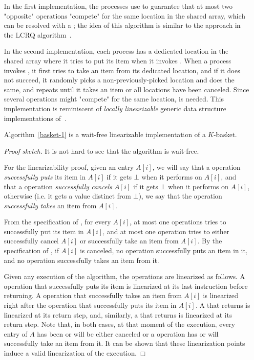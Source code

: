 In the first implementation, the processes use \FAI to guarantee that at most two "opposite" operations "compete" for the same location in the shared array, which can be resolved with a \SWAP; the idea of this algorithm is similar to the approach in the LCRQ algorithm~\cite{ppopp2013x86queues}.

In the second implementation, each process has a dedicated location in the shared array where it tries to put its item when it invokes \Put. When a process invokes \Take, it first tries to take an item from its dedicated location, and if it does not succeed, it randomly picks a non-previously-picked location and does the same, and repeats until it takes an item or all locations have been canceled.  Since several operations might "compete" for the same location, \CAS is needed.  This implementation is reminiscent of \emph{locally linearizable} generic data structure implementations of~\cite{DBLP_conf_concur_HaasHHKLPSSV16}.

\begin{theorem}
Algorithm~\ref{basket-1} is a wait-free linearizable implementation of a $K$-basket.
\end{theorem}

\begin{proof}[Proof sketch]
It is not hard to see that the algorithm is wait-free.

For the linearizability proof, given an entry $A[i]$, we will say that a \Put operation \emph{successfully puts} its item in $A[i]$ if it gets $\bot$ when it performs \SWAP on $A[i]$, and that a \Take operation \emph{successfully cancels} $A[i]$ if it gets $\bot$ when it performs \SWAP on $A[i]$, otherwise (i.e. it gets a value distinct from $\bot$), we say that the \Take operation \emph{successfully takes} an item from $A[i]$.

From the specification of \FAI, for every $A[i]$, at most one \Put operations tries to successfully put its item in $A[i]$, and at most one \Take operation tries to either successfully cancel $A[i]$ or successfully take an item from $A[i]$.  By the specification of \SWAP, if $A[i]$ is canceled, no \Put operation successfully puts an item in it, and no \Take operation successfully takes an item from it.

Given any execution of the algorithm, the operations are linearized as follows.  A \Put operation that successfully puts its item is linearized at its last \FAI instruction before returning.  A \Take operation that successfully takes an item from $A[i]$ is linearized right after the \Put operation that successfully puts its item in $A[i]$.  A \Put that returns \full is linearized at its return step, and, similarly, a \Take that returns \closed is linearized at its return step.  Note that, in both cases, at that moment of the execution, every entry of $A$ has been or will be either canceled or a \Take operation has or will successfully take an item from it.  It can be shown that these linearization points induce a valid linearization of the execution.
\end{proof}


